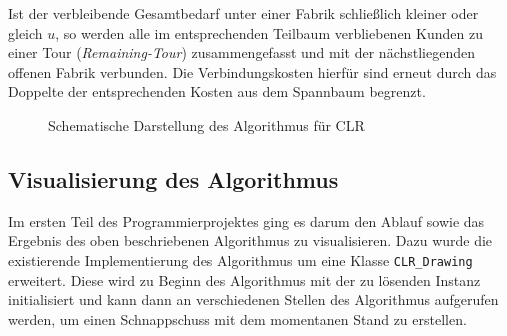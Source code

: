 \documentclass[a4paper,ngerman,11pt,bibtotoc]{scrartcl}
\theoremstyle{definition}
\theoremstyle{plain}
\theoremstyle{remark}
\begin{document}
\begin{description}
	Ist der verbleibende Gesamtbedarf unter einer Fabrik schließlich kleiner oder gleich $u$, so werden alle im entsprechenden Teilbaum verbliebenen Kunden zu einer Tour (\emph{Remaining-Tour}) zusammengefasst und mit der nächstliegenden offenen Fabrik verbunden. Die Verbindungskosten hierfür sind erneut durch das Doppelte der entsprechenden Kosten aus dem Spannbaum begrenzt.
\end{description}

\begin{figure}[H]
	\begin{tiny}
		
	\end{tiny}
	\caption{Schematische Darstellung des Algorithmus für CLR}\label{fig:CLRAlg}
\end{figure}

\subsection{Visualisierung des Algorithmus}

Im ersten Teil des Programmierprojektes ging es darum den Ablauf sowie das Ergebnis des oben beschriebenen Algorithmus zu visualisieren. Dazu wurde die existierende Implementierung des Algorithmus um eine Klasse \lstinline|CLR_Drawing| erweitert. Diese wird zu Beginn des Algorithmus mit der zu lösenden Instanz initialisiert und kann dann an verschiedenen Stellen des Algorithmus aufgerufen werden, um einen Schnappschuss mit dem momentanen Stand zu erstellen. 
\end{document}
